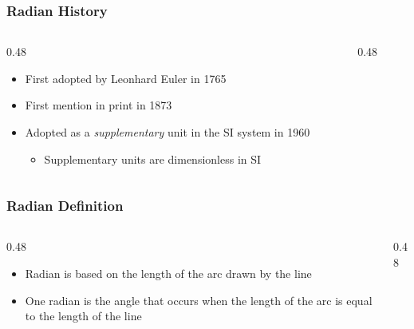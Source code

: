 \begin{frame}
	\frametitle{Radian History}

    \begin{columns}
        \begin{column}{0.48\linewidth}
            \begin{itemize}[<+- | alert@+>]
                \item First adopted by Leonhard Euler in 1765
                \item First mention in print in 1873
                \item Adopted as a \emph{supplementary} unit in the SI system in 1960
                    \begin{itemize}
                        \item Supplementary units are dimensionless in SI
                    \end{itemize}
            \end{itemize}
        \end{column}
        \begin{column}{0.48\linewidth}
        \end{column}
    \end{columns}
\end{frame}

\begin{frame}
	\frametitle{Radian Definition}

    \begin{columns}
        \begin{column}{0.48\linewidth}
            \begin{itemize}[<+- | alert@+>]
                \item Radian is based on the length of the arc drawn by the line
                \item One radian is the angle that occurs when the length of the arc is equal to the length of the line
            \end{itemize}
        \end{column}
        \begin{column}{0.48\linewidth}
            \centering
            \resizebox{\linewidth}{!}{
                
            }
        \end{column}
    \end{columns}
\end{frame}

